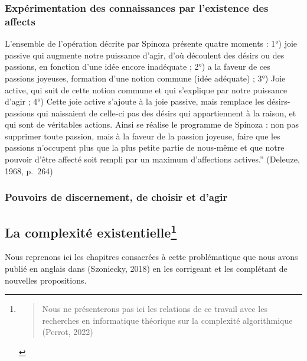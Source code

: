 \documentclass[
  letterpaper,
  DIV=11,
  numbers=noendperiod]{scrreprt}
\begin{document}
\hypertarget{expuxe9rimentation-des-connaissances-par-lexistence-des-affects}{%
\subsubsection{Expérimentation des connaissances par l'existence des
affects}\label{expuxe9rimentation-des-connaissances-par-lexistence-des-affects}}

L'ensemble de l'opération décrite par Spinoza présente quatre moments :
1°) joie passive qui augmente notre puissance d'agir, d'où découlent des
désirs ou des passions, en fonction d'une idée encore inadéquate ; 2°) a
la faveur de ces passions joyeuses, formation d'une notion commune (idée
adéquate) ; 3°) Joie active, qui suit de cette notion commune et qui
s'explique par notre puissance d'agir ; 4°) Cette joie active s'ajoute à
la joie passive, mais remplace les désirs-passions qui naissaient de
celle-ci pas des désirs qui appartiennent à la raison, et qui sont de
véritables actions. Ainsi se réalise le programme de Spinoza : non pas
supprimer toute passion, mais à la faveur de la passion joyeuse, faire
que les passions n'occupent plus que la plus petite partie de nous-même
et que notre pouvoir d'être affecté soit rempli par un maximum
d'affections actives.'' (Deleuze, 1968, p.~264)

\hypertarget{pouvoirs-de-discernement-de-choisir-et-dagir}{%
\subsubsection{Pouvoirs de discernement, de choisir et
d'agir}\label{pouvoirs-de-discernement-de-choisir-et-dagir}}

\hypertarget{sec-complexiteExitentielle}{%
\subsection[La complexité existentielle]{\texorpdfstring{La complexité
existentielle\footnote{\begin{quote}
  Nous ne présenterons pas ici les relations de ce travail avec les
  recherches en informatique théorique sur la complexité algorithmique
  (Perrot, 2022)
  \end{quote}}}{La complexité existentielle}}\label{sec-complexiteExitentielle}}

Nous reprenons ici les chapitres consacrées à cette problématique que
nous avons publié en anglais dans (Szoniecky, 2018) en les corrigeant et
les complétant de nouvelles propositions.
\end{document}

